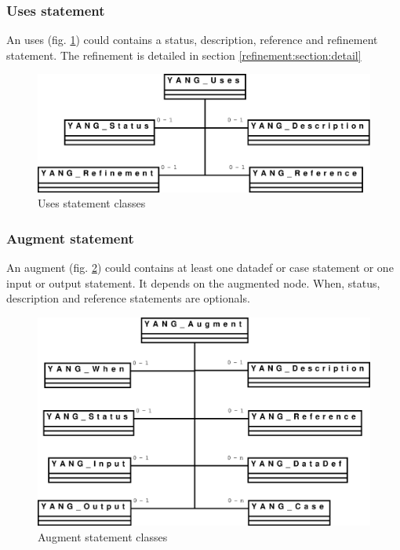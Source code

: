 \documentclass[a4paper]{article}
\begin{document}
\subsubsection{Uses statement}
\label{uses:section:global}

An  uses  (fig.  \ref{uses})  could  contains  a status,  description,
reference  and refinement  statement.  The refinement  is detailed  in
section \ref{refinement:section:detail}
\begin{figure}[htbp]
\begin{center}
\includegraphics[scale = .3]{uses.eps}
\end{center}
\caption{Uses statement classes}
\label{uses}
\end{figure}

\subsubsection{Augment statement}

An augment (fig. \ref{augment}) could contains at least one datadef or
case statement  or one  input or output  statement. It depends  on the
augmented node. When, status, description and reference statements are
optionals.
\begin{figure}[htbp]
\begin{center}
\includegraphics[scale = .3]{augment.eps}
\end{center}
\caption{Augment statement classes}
\label{augment}
\end{figure}
\end{document}
